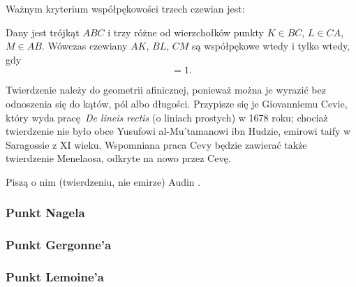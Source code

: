 %

Ważnym kryterium współpękowości trzech czewian jest:

\begin{theorem}[Cevy]
	Dany jest trójkąt $ABC$ i trzy różne od wierzchołków punkty $K \in BC$, $L \in CA$, $M \in AB$.
	Wówczas czewiany $AK$, $BL$, $CM$ są współpękowe wtedy i tylko wtedy, gdy
	\begin{equation}
		[AMB] [BKC] [CLA] = 1.
	\end{equation}
\end{theorem}

Twierdzenie należy do geometrii afinicznej, ponieważ można je wyrazić bez odnoszenia się do kątów, pól albo długości.
Przypisze się je Giovanniemu Cevie, który wyda pracę \emph{De lineis rectis} (o liniach prostych) w 1678 roku; chociaż twierdzenie nie było obce Yusufowi al-Mu'tamanowi ibn Hudzie, emirowi taify w Saragossie z XI wieku.
Wspomniana praca Cevy będzie zawierać także twierdzenie Menelaosa, odkryte na nowo przez Cevę.

Piszą o nim (twierdzeniu, nie emirze) Audin \cite[s. 38]{audin_2003}.

\begin{proposition}
\end{proposition}

\subsubsection{Punkt Nagela}

\subsubsection{Punkt Gergonne'a}


\subsubsection{Punkt Lemoine'a}




%